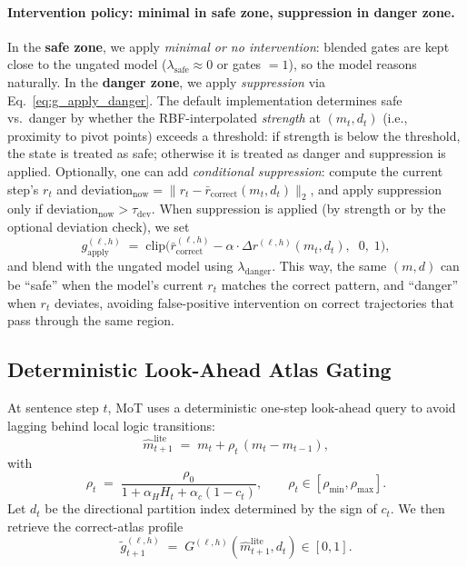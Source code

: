 \documentclass{article}
\begin{document}
\paragraph{Intervention policy: minimal in safe zone, suppression in danger zone.}
In the \textbf{safe zone}, we apply \emph{minimal or no intervention}: blended gates are kept close to the ungated model ($\lambda_{\mathrm{safe}}\approx 0$ or gates $=1$), so the model reasons naturally. In the \textbf{danger zone}, we apply \emph{suppression} via Eq.~\eqref{eq:g_apply_danger}. The default implementation determines safe vs.\ danger by whether the RBF-interpolated \emph{strength} at $(m_t,d_t)$ (i.e., proximity to pivot points) exceeds a threshold: if strength is below the threshold, the state is treated as safe; otherwise it is treated as danger and suppression is applied. Optionally, one can add \emph{conditional suppression}: compute the current step's $r_t$ and $\mathrm{deviation}_{\mathrm{now}} = \|r_t - \bar r_{\mathrm{correct}}(m_t,d_t)\|_2$, and apply suppression only if $\mathrm{deviation}_{\mathrm{now}} > \tau_{\mathrm{dev}}$. When suppression is applied (by strength or by the optional deviation check), we set
\begin{equation}
g_{\mathrm{apply}}^{(\ell,h)} \;=\; \mathrm{clip}\bigl( \bar r_{\mathrm{correct}}^{(\ell,h)} - \alpha \cdot \Delta r^{(\ell,h)}(m_t,d_t),\;\; 0,\; 1 \bigr),
\label{eq:g_apply_danger}
\end{equation}
and blend with the ungated model using $\lambda_{\mathrm{danger}}$. This way, the same $(m,d)$ can be ``safe'' when the model's current $r_t$ matches the correct pattern, and ``danger'' when $r_t$ deviates, avoiding false-positive intervention on correct trajectories that pass through the same region.

\subsection{Deterministic Look-Ahead Atlas Gating}
\label{sec:predictive}
At sentence step $t$, MoT uses a deterministic one-step look-ahead query to avoid lagging behind local logic transitions:
\begin{equation}
\hat m^{\mathrm{lite}}_{t+1} \;=\; m_t + \rho_t\,(m_t-m_{t-1}),
\label{eq:predict_state_lite}
\end{equation}
with
\begin{equation}
\rho_t \;=\; \frac{\rho_0}{1+\alpha_H H_t + \alpha_c(1-c_t)},
\qquad \rho_t\in[\rho_{\min},\rho_{\max}].
\label{eq:rho}
\end{equation}
Let $d_t$ be the directional partition index determined by the sign of $c_t$. We then retrieve the correct-atlas profile
\begin{equation}
\tilde g^{(\ell,h)}_{t+1}
\;=\;
G^{(\ell,h)}(\hat m^{\mathrm{lite}}_{t+1}, d_t)\in[0,1].
\label{eq:gh_main}
\end{equation}
\end{document}
